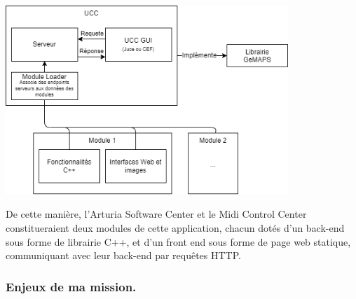 \documentclass[francais]{rapportPFE}  %
\begin{document}
\begin{center}
	\centering
	\includegraphics[width=0.8\textwidth]{graphics/modulaire.png}
	\begin{tiny}
	\end{tiny}
	\label{fig}
\end{center}

De cette manière, l'Arturia Software Center et le Midi Control Center constitueraient deux modules de cette application, chacun dotés d'un back-end sous forme de librairie C++, et d'un front end sous forme de page web statique, communiquant avec leur back-end par requêtes HTTP.\\

\subsubsection{Enjeux de ma mission.}
\end{document}

